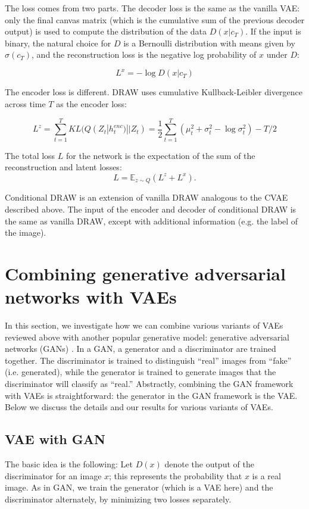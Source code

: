 \documentclass[10pt]{article}
\newcommand{\E}{\mathbb{E}}
\begin{document}
The loss comes from two parts. The decoder loss is the same as the vanilla VAE: only the final canvas matrix (which is the cumulative sum of the previous decoder output) is used to compute the distribution of the data $D(x|c_T)$. If the input is binary, the natural choice for $D$ is a Bernoulli distribution with means given by $\sigma(c_T)$, and the reconstruction loss is the negative log probability of $x$ under $D$:

$$L^{x} = - \log D(x|c_T)$$

The encoder loss is different. DRAW uses cumulative Kullback-Leibler divergence across time $T$ as the encoder loss:

$$L^z = \sum_{t=1}^{T} KL(Q(Z_t|h_{t}^{enc})||Z_t) = \frac{1}{2}\sum_{t=1}^{T}(\mu_t^2 + \sigma_t^2 - \log \sigma^2_t) - T/2$$

The total loss $L$ for the network is the expectation of the sum of the reconstruction and latent losses:
$$L = \E_{z \sim Q} (L^z + L^x).$$

Conditional DRAW is an extension of vanilla DRAW analogous to the CVAE described above. The input of the encoder and decoder of conditional DRAW is the same as vanilla DRAW, except with additional information (e.g. the label of the image).







\section{Combining generative adversarial networks with VAEs}

In this section, we investigate how we can combine various variants of VAEs reviewed above with another popular generative model: generative adversarial networks (GANs) \cite{goodfellow2014gan}. In a GAN, a generator and a discriminator are trained together.
The discriminator is trained to distinguish ``real'' images from ``fake'' (i.e. generated), while the generator is trained to generate images that the discriminator will classify as ``real.''
Abstractly, combining the GAN framework with VAEs is straightforward: the generator in the GAN framework is the VAE. Below we discuss the details and our results for various variants of VAEs.

\subsection{VAE with GAN}
The basic idea is the following: Let $D(x)$ denote the output of the discriminator for an image $x$; this represents the probability that $x$ is a real image. As in GAN, we train the generator (which is a VAE here) and the discriminator alternately, by minimizing two losses separately.
\end{document}
